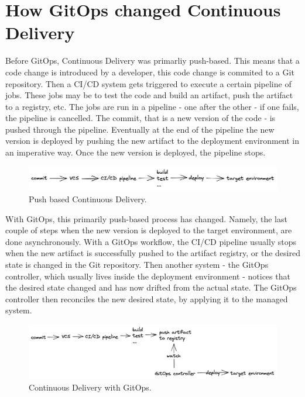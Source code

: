\section{How GitOps changed Continuous Delivery}
\label{theoretical-background:gitops-cd}

Before GitOps, Continuous Delivery was primarliy push-based.
This means that a code change is introduced by a developer,
this code change is commited to a Git repository.
Then a CI/CD system gets triggered to execute a certain pipeline
of jobs.
These jobs may be to test the code and build an artifact, push the artifact
to a registry, etc.
The jobs are run in a pipeline - one after the other -
if one fails, the pipeline is cancelled.
The commit, that is a new version of the code -
is pushed through the pipeline.
Eventually at the end of the pipeline
the new version is deployed by pushing the new artifact
to the deployment environment in an imperative way.
Once the new version is deployed, the pipeline stops.

\begin{figure}[h]
	\centering
	\includegraphics[width=1.00\linewidth]{assets/push-based-cd.png}
	\caption{Push based Continuous Delivery.
	}
	\label{fig:pushBasedCD}	
\end{figure}

With GitOps, this primarily push-based process has changed.
Namely, the last couple of steps when the new version
is deployed to the target environment,
are done asynchronously.
With a GitOps workflow,
the CI/CD pipeline usually stops when the new artifact
is successfully pushed to the artifact registry,
or the desired state is changed in the Git repository.
Then another system - the GitOps controller,
which usually lives inside the deployment environment -
notices that the desired state changed and has now
drifted from the actual state.
The GitOps controller then reconciles the new desired state,
by applying it to the managed system.

\begin{figure}[h]
	\centering
	\includegraphics[width=1.00\linewidth]{assets/cd-gitops.png}
	\caption{Continuous Delivery with GitOps.
	}
	\label{fig:cd-gitops}	
\end{figure}

